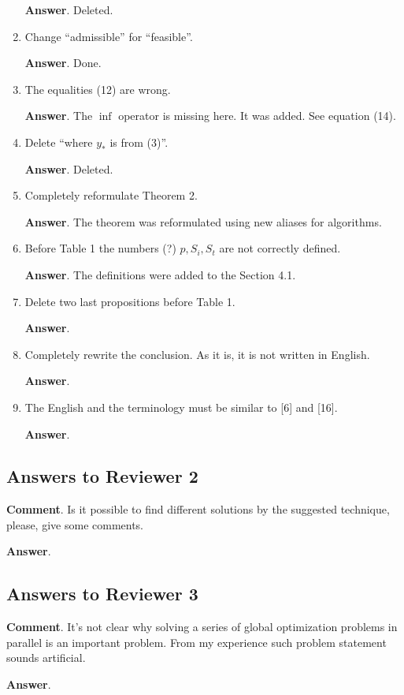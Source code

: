 \documentclass{article}%
\begin{document}
\begin{enumerate}
\textbf{Answer}.
Deleted.

\item  Change “admissible” for “feasible”.

\textbf{Answer}.
Done.

\item  The equalities (12) are wrong.

\textbf{Answer}.
The $\inf$ operator is missing here. It was added. See equation (14).

\item  Delete “where $y_*$ is from (3)”.

\textbf{Answer}.
Deleted.

\item  Completely reformulate Theorem 2.

\textbf{Answer}.
The theorem was reformulated using new aliases for algorithms.

\item  Before Table 1 the numbers (?) $p, S_i, S_t$ are not correctly defined.

\textbf{Answer}.
The definitions were added to the Section 4.1.

\item  Delete two last propositions before Table 1.

\textbf{Answer}.

\item  Completely rewrite the conclusion. As it is, it is not written in English.

\textbf{Answer}.

\item  The English and the terminology must be similar to [6] and [16].

\textbf{Answer}.

\end{enumerate}



\subsection*{Answers to Reviewer 2}

\textbf{Comment}. Is it possible to find different solutions by the suggested technique, please, give some comments.

\textbf{Answer}.


\subsection*{Answers to Reviewer 3}

\textbf{Comment}. It's not clear why solving a series of global optimization problems in parallel is an important problem. From my experience such problem statement sounds artificial.

\textbf{Answer}.
\end{document}
